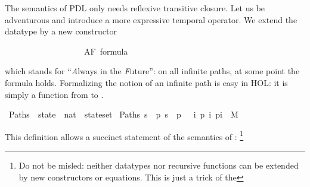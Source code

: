 %
\begin{isabellebody}%
\def\isabellecontext{CTL}%
%
\isadelimtheory
%
\endisadelimtheory
%
\isatagtheory
%
\endisatagtheory
{\isafoldtheory}%
%
\isadelimtheory
%
\endisadelimtheory
%
\isamarkuptrue%
%
\begin{isamarkuptext}%
\label{sec:CTL}
%
The semantics of PDL only needs reflexive transitive closure.
Let us be adventurous and introduce a more expressive temporal operator.
We extend the datatype
 by a new constructor%
\end{isamarkuptext}%
\isamarkuptrue%
\ \ \ \ \ \ \ \ \ \ \ \ \ \ \ \ \ \ {}\ AF\ formula%
\begin{isamarkuptext}%
\noindent
which stands for ``\emph{A}lways in the \emph{F}uture'':
on all infinite paths, at some point the formula holds.
Formalizing the notion of an infinite path is easy
in HOL: it is simply a function from  to .%
\end{isamarkuptext}%
\isamarkuptrue%
\isamarkupfalse%
\ Paths\ {}{}\ {}state\ {}\ {}nat\ {}\ state{}set{}\ \isanewline
{}Paths\ s\ {}\ {}p{}\ s\ {}\ p\ {}\ {}\ {}{}i{}\ {}p\ i{}\ p{}i{}{}{}{}\ {}\ M{}{}{}%
\begin{isamarkuptext}%
\noindent
This definition allows a succinct statement of the semantics of :
\footnote{Do not be misled: neither datatypes nor recursive functions can be
extended by new constructors or equations. This is just a trick of the
}
\end{isamarkuptext}
\end{isabellebody}
